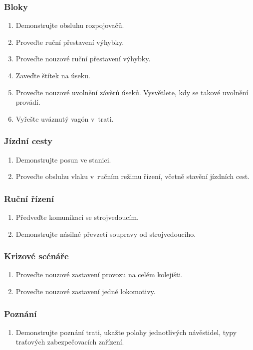 \documentclass[12pt,a4paper]{article}
\begin{document}
\subsubsection*{Bloky}
\begin{enumerate}[leftmargin=*]
\item Demonstrujte obsluhu rozpojovačů.
\item Proveďte ruční přestavení výhybky.
\item Proveďte nouzové ruční přestavení výhybky.
\item Zaveďte štítek na úseku.
\item Proveďte nouzové uvolnění závěrů úseků. Vysvětlete, kdy se takové uvolnění
provádí.
\item Vyřešte uváznutý vagón v~trati.
\end{enumerate}

\subsubsection*{Jízdní cesty}
\begin{enumerate}[leftmargin=*]
\item Demonstrujte posun ve stanici.
\item Proveďte obsluhu vlaku v~ručním režimu řízení, včetně stavění jízdních
cest.
\end{enumerate}

\subsubsection*{Ruční řízení}
\begin{enumerate}[leftmargin=*]
\item Předveďte komunikaci se strojvedoucím.
\item Demonstrujte násilné převzetí soupravy od strojvedoucího.
\end{enumerate}

\subsubsection*{Krizové scénáře}
\begin{enumerate}[leftmargin=*]
\item Proveďte nouzové zastavení provozu na celém kolejišti.
\item Proveďte nouzové zastavení jedné lokomotivy.
\end{enumerate}

\subsubsection*{Poznání}
\begin{enumerate}[leftmargin=*]
\item Demonstrujte poznání trati, ukažte polohy jednotlivých návěstidel, typy
traťových zabezpečovacích zařízení.
\end{enumerate}
\end{document}
